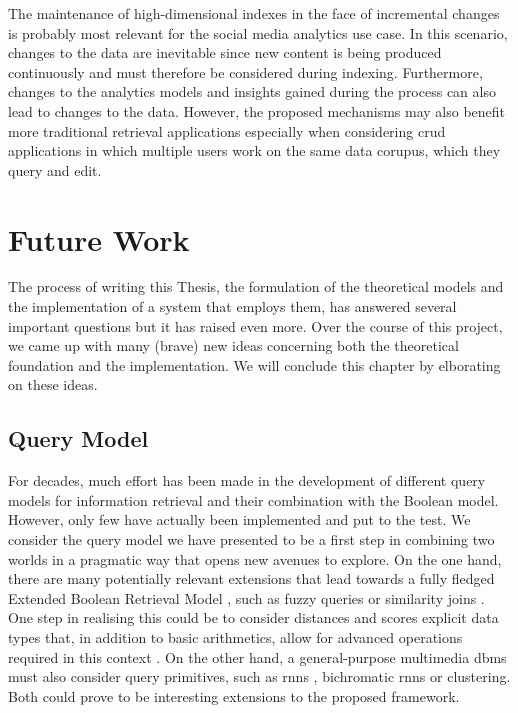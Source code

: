 The maintenance of high-dimensional indexes in the face of incremental changes is probably most relevant for the social media analytics use case. In this scenario, changes to the data are inevitable since new content is being produced continuously and must therefore be considered during indexing. Furthermore, changes to the analytics models and insights gained during the process can also lead to changes to the data. However, the proposed mechanisms may also benefit more traditional retrieval applications especially when considering \acrshort{crud} applications in which multiple users work on the same data corupus, which they query and edit.

\section{Future Work}

The process of writing this Thesis, the formulation of the theoretical models and the implementation of a system that employs them, has answered several important questions but it has raised even more. Over the course of this project, we came up with many (brave) new ideas concerning both the theoretical foundation and the implementation. We will conclude this chapter by elborating on these ideas.

\subsection{Query Model}

For decades, much effort has been made in the development of different query models for information retrieval and their combination with the Boolean model. However, only few have actually been implemented and put to the test. We consider the query model we have presented to be a first step in combining two worlds in a pragmatic way that opens new avenues to explore. On the one hand, there are many potentially relevant extensions that lead towards a fully fledged Extended Boolean Retrieval Model \cite{Salton:1983Extended}, such as fuzzy queries \cite{Umano:1983Retrieval,Bohm:2001Fast} or similarity joins \cite{Yao:2010K}. One step in realising this could be to consider distances and scores explicit data types that, in addition to basic arithmetics, allow for advanced operations required in this context \cite{Silva:2010SimDB}. On the other hand, a general-purpose multimedia \acrshort{dbms} must also consider query primitives, such as \acrshort{rnns} \cite{Korn:2000Influence}, bichromatic \acrshort{rnns} \cite{Stanoi:2001Discovery} or clustering. Both could prove to be interesting extensions to the proposed framework.

